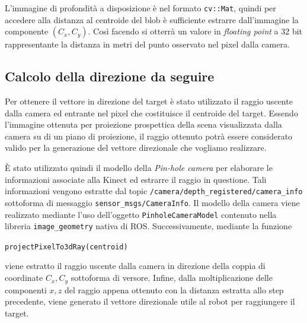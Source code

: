 L'immagine di profondità a disposizione è nel formato \texttt{cv::Mat}, quindi per accedere alla distanza al centroide del blob è sufficiente estrarre dall'immagine la componente $(C_x,C_y)$. Così facendo si otterrà un valore in {\itshape floating point} a 32 bit rappresentante la distanza in metri del punto osservato nel pixel dalla camera.

\subsection{Calcolo della direzione da seguire}
Per ottenere il vettore in direzione del target è stato utilizzato il raggio uscente dalla camera ed entrante nel pixel che costituisce il centroide del target.\newline
Essendo l'immagine ottenuta per proiezione prospettica della scena visualizzata dalla camera su di un piano di proiezione, il raggio ottenuto potrà essere considerato valido per la generazione del vettore direzionale che vogliamo realizzare.

È stato utilizzato quindi il modello della {\itshape Pin-hole camera} per elaborare le informazioni associate alla Kinect ed estrarre il raggio in questione. Tali informazioni vengono estratte dal topic \texttt{/camera/depth\_registered/camera\_info} sottoforma di messaggio \texttt{sensor\_msgs/CameraInfo}.
Il modello della camera viene realizzato mediante l'uso dell'oggetto \texttt{PinholeCameraModel} contenuto nella libreria \texttt{image\_geometry} nativa di ROS.
Successivamente, mediante la funzione
\begin{center}
	\texttt{projectPixelTo3dRay(centroid)}
\end{center}
viene estratto il raggio uscente dalla camera in direzione della coppia di coordinate $C_x,C_y$ sottoforma di versore. Infine, dalla moltiplicazione delle componenti $x,z$ del raggio appena ottenuto con la distanza estratta allo step precedente, viene generato il vettore direzionale utile al robot per raggiungere il target.

